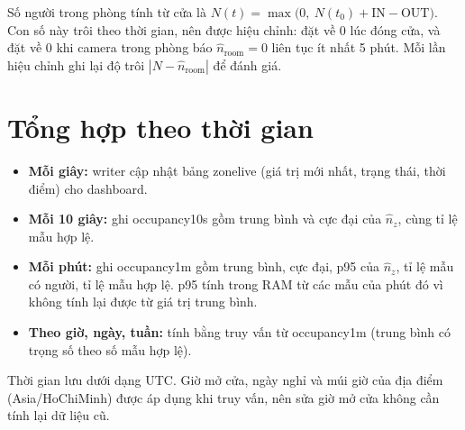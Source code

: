 \documentclass[10pt,a4paper,oneside,openany]{report}
\newcommand{\breakus}{\textunderscore\allowbreak}
\newcommand{\code}[1]{{\ttfamily\let\_\breakus #1}}
\begin{document}
Số người trong phòng tính từ cửa là $N(t) = \max\bigl(0,\ N(t_0) + \text{IN} - \text{OUT}\bigr)$. Con số này trôi theo thời gian, nên
được hiệu chỉnh: đặt về 0 lúc đóng cửa, và đặt về 0 khi camera trong phòng báo $\hat n_{\text{room}} = 0$ liên tục ít nhất 5 phút.
Mỗi lần hiệu chỉnh ghi lại độ trôi $|N - \hat n_{\text{room}}|$ để đánh giá.

\section{Tổng hợp theo thời gian}\label{sec:tonghop}
\begin{itemize}
  \item \textbf{Mỗi giây:} writer cập nhật bảng \code{zone\_live} (giá trị mới nhất, trạng thái, thời điểm) cho dashboard.
  \item \textbf{Mỗi 10 giây:} ghi \code{occupancy\_10s} gồm trung bình và cực đại của $\hat n_z$, cùng tỉ lệ mẫu hợp lệ.
  \item \textbf{Mỗi phút:} ghi \code{occupancy\_1m} gồm trung bình, cực đại, p95 của $\hat n_z$, tỉ lệ mẫu có người, tỉ lệ mẫu hợp lệ.
        p95 tính trong RAM từ các mẫu của phút đó vì không tính lại được từ giá trị trung bình.
  \item \textbf{Theo giờ, ngày, tuần:} tính bằng truy vấn từ \code{occupancy\_1m} (trung bình có trọng số theo số mẫu hợp lệ).
\end{itemize}
Thời gian lưu dưới dạng UTC. Giờ mở cửa, ngày nghỉ và múi giờ của địa điểm (\code{Asia/Ho\_Chi\_Minh}) được áp dụng khi truy vấn, nên
sửa giờ mở cửa không cần tính lại dữ liệu cũ.
\end{document}
